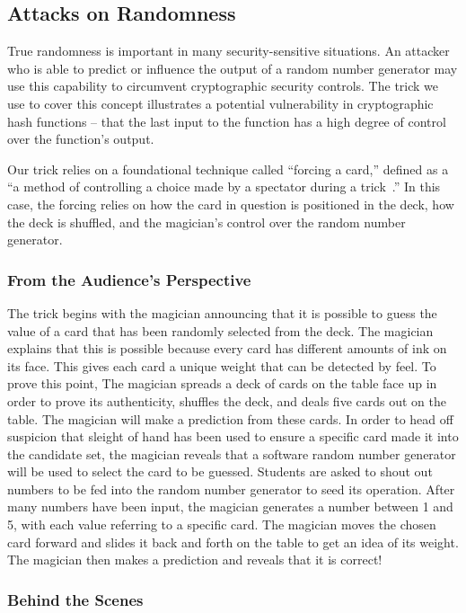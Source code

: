 \subsection{Attacks on Randomness}


True randomness is important in many
security-sensitive situations.
An attacker who is able to predict or influence the output of a random number
generator may use this capability to circumvent cryptographic security controls.
The trick we use to cover this concept
illustrates a potential vulnerability in cryptographic hash functions
-- that the last input to the function has a high degree of control over
the function's output.

Our trick relies on a foundational technique called ``forcing a card,''
defined as a ``a method of controlling a choice made by a spectator during
a trick~\cite{forcingcard}.''
In this case, the forcing relies on how the card in question is positioned
in the deck, how the deck is shuffled, and the magician's control over the
random number generator.

\subsubsection{From the Audience's Perspective}

The trick begins with the magician announcing that it is possible to
guess the value of a card that
has been randomly selected from the deck.
The magician
explains that this is possible because every
card has different amounts of ink on its face.
This gives each card
a unique
weight that can be detected by feel.
To prove this point,
The magician spreads a deck of cards on the table face up
in order to prove its authenticity,
shuffles the deck,
and deals five cards out on the table.
The magician will make a prediction from these cards.
In order to head off suspicion that sleight of hand has been used to ensure
a specific card made it into the candidate set, the magician reveals that
a software random number generator will be used to select the card to be
guessed.
Students are asked to shout out numbers to be fed into the random number
generator to seed its operation.  After many numbers have been input, the
magician generates a number between 1 and 5, with each value referring to a
specific card.  The magician moves the chosen card forward and slides it back
and forth on the table to get an idea of its weight.  The magician then makes
a prediction and reveals that it is correct!

\subsubsection{Behind the Scenes}

